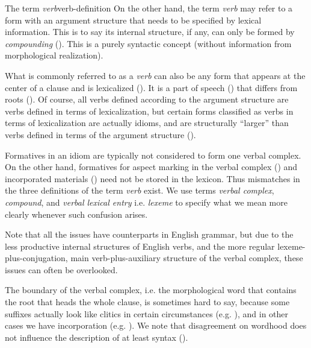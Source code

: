 \documentclass[UTF8, a4paper, oneside, scheme=plain, 12pt]{ctexrep}
\newcommand*{\term}[1]{\emph{#1}}
\begin{document}
\begin{theorybox}{The term \term{verb}}{verb-definition}
    On the other hand, the term \term{verb} may refer to a form with an argument structure
    that needs to be specified by lexical information.
    This is to say its internal structure, if any,
    can only be formed by \term{compounding} ().
    This is a purely syntactic concept (without information from morphological realization).
    
    What is commonly referred to as a \term{verb} 
    can also be any form that appears at the center of a clause and is lexicalized ().
    It is a part of speech () that differs from roots ().
    Of course, all verbs defined according to the argument structure are verbs defined in terms of lexicalization,
    but certain forms classified as verbs in terms of lexicalization are actually idioms,
    and are structurally ``larger'' than verbs defined in terms of the argument structure
    ().

    Formatives in an idiom are typically not considered to form one verbal complex.
    On the other hand, formatives for aspect marking in the verbal complex ()
    and incorporated materials () need not be stored in the lexicon.
    Thus mismatches in the three definitions of the term \term{verb} exist.
    We use terms \term{verbal complex}, \term{compound}, and \term{verbal lexical entry} i.e. \term{lexeme}
    to specify what we mean more clearly whenever such confusion arises.

    Note that all the issues have counterparts in English grammar,
    but due to the less productive internal structures of English verbs,
    and the more regular lexeme-plus-conjugation, main verb-plus-auxiliary structure of the verbal complex,
    these issues can often be overlooked.
\end{theorybox}

The boundary of the verbal complex, i.e. the morphological word that contains the root that heads the whole clause,
is sometimes hard to say,
because some suffixes actually look like clitics in certain circumstances
(e.g. ),
and in other cases we have incorporation (e.g. ).
We note that disagreement on wordhood does not influence the description of at least syntax
().
\end{document}
